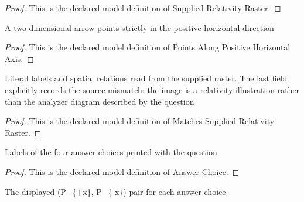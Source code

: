 \begin{proof}
  This is the declared model definition of Supplied Relativity Raster.
\end{proof}
\begin{definition}
  \label{def:physics:phyx-mini-0541:phyxminiproblems-problemphyxmini0541-pointsalongpositivehorizontalaxis}
  A two-dimensional arrow points strictly in the positive horizontal direction
\end{definition}
\begin{proof}
  This is the declared model definition of Points Along Positive Horizontal Axis.
\end{proof}
\begin{definition}
  \label{def:physics:phyx-mini-0541:phyxminiproblems-problemphyxmini0541-matchessuppliedrelativityraster}
  Literal labels and spatial relations read from the supplied raster. The last field explicitly records the source mismatch: the image is a relativity illustration rather than the analyzer diagram described by the question
\end{definition}
\begin{proof}
  This is the declared model definition of Matches Supplied Relativity Raster.
\end{proof}
\begin{definition}
  \label{def:physics:phyx-mini-0541:phyxminiproblems-problemphyxmini0541-answerchoice}
  Labels of the four answer choices printed with the question
\end{definition}
\begin{proof}
  This is the declared model definition of Answer Choice.
\end{proof}
\begin{definition}
  \label{def:physics:phyx-mini-0541:phyxminiproblems-problemphyxmini0541-displayedprobabilitypair}
  The displayed (P\_\{+x\}, P\_\{-x\}) pair for each answer choice
\end{definition}
